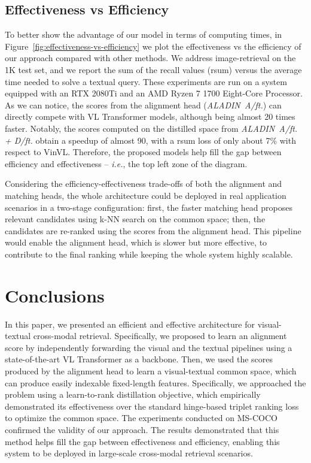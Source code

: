 \documentclass[sigconf]{acmart}
\def \ie {\emph{i.e.}}
\newcommand{\ourmodel}{ALADIN}    \settopmatter{authorsperrow=4}
\begin{document}
\subsection{Effectiveness vs Efficiency}
To better show the advantage of our model in terms of computing times, in Figure~\ref{fig:effectiveness-vs-efficiency} we plot the effectiveness vs the efficiency of our approach compared with other methods. We address image-retrieval on the 1K test set, and we report the sum of the recall values (rsum) versus the average time needed to solve a textual query. These experiments are run on a system equipped with an RTX 2080Ti and an AMD Ryzen 7 1700 Eight-Core Processor. As we can notice, the scores from the alignment head (\textit{\ourmodel\ A/ft.}) can directly compete with VL Transformer models, although being almost 20 times faster. Notably, the scores computed on the distilled space from \textit{\ourmodel\ A/ft. + D/ft.} obtain a speedup of almost 90, with a rsum loss of only about 7\% with respect to VinVL.
Therefore, the proposed models help fill the gap between efficiency and effectiveness -- \ie, the top left zone of the diagram.

Considering the efficiency-effectiveness trade-offs of both the alignment and matching heads, the whole architecture could be deployed in real application scenarios in a two-stage configuration: first, the faster matching head proposes relevant candidates using k-NN search on the common space; then, the candidates are re-ranked using the scores from the alignment head. This pipeline would enable the alignment head, which is slower but more effective, to contribute to the final ranking while keeping the whole system highly scalable.


 \section{Conclusions}
In this paper, we presented an efficient and effective architecture for visual-textual cross-modal retrieval. Specifically, we proposed to learn an alignment score by independently forwarding the visual and the textual pipelines using a state-of-the-art VL Transformer as a backbone. Then, we used the scores produced by the alignment head to learn a visual-textual common space, which can produce easily indexable fixed-length features. Specifically, we approached the problem using a learn-to-rank distillation objective, which empirically demonstrated its effectiveness over the standard hinge-based triplet ranking loss to optimize the common space. The experiments conducted on MS-COCO confirmed the validity of our approach. The results demonstrated that this method helps fill the gap between effectiveness and efficiency, enabling this system to be deployed in large-scale cross-modal retrieval scenarios. 
\end{document}
